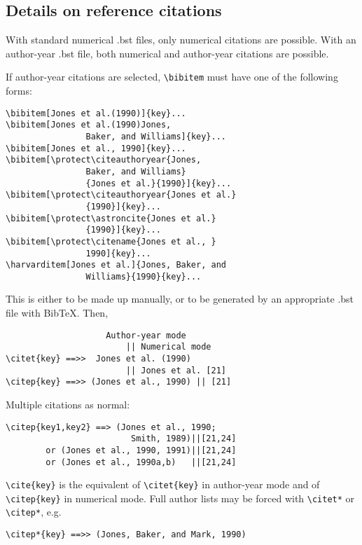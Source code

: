 \documentclass[unnumsec,webpdf,contemporary,large]{oup-authoring-template}%
\theoremstyle{thmstyleone}%
\theoremstyle{thmstyletwo}%
\theoremstyle{thmstylethree}%
\begin{document}
\subsection{Details on reference citations}\label{subsec3}

With standard numerical .bst files, only numerical citations are possible.
With an author-year .bst file, both numerical and author-year citations are possible.

If author-year citations are selected, \verb+\bibitem+ must have one of the following forms:


{\footnotesize%
\begin{verbatim}
\bibitem[Jones et al.(1990)]{key}...
\bibitem[Jones et al.(1990)Jones,
                Baker, and Williams]{key}...
\bibitem[Jones et al., 1990]{key}...
\bibitem[\protect\citeauthoryear{Jones,
                Baker, and Williams}
                {Jones et al.}{1990}]{key}...
\bibitem[\protect\citeauthoryear{Jones et al.}
                {1990}]{key}...
\bibitem[\protect\astroncite{Jones et al.}
                {1990}]{key}...
\bibitem[\protect\citename{Jones et al., }
                1990]{key}...
\harvarditem[Jones et al.]{Jones, Baker, and
                Williams}{1990}{key}...
\end{verbatim}}


This is either to be made up manually, or to be generated by an
appropriate .bst file with BibTeX. Then,


{%
\begin{verbatim}
                    Author-year mode
                        || Numerical mode
\citet{key} ==>>  Jones et al. (1990)
                        || Jones et al. [21]
\citep{key} ==>> (Jones et al., 1990) || [21]
\end{verbatim}}


\noindent
Multiple citations as normal:


{%
\begin{verbatim}
\citep{key1,key2} ==> (Jones et al., 1990;
                         Smith, 1989)||[21,24]
        or (Jones et al., 1990, 1991)||[21,24]
        or (Jones et al., 1990a,b)   ||[21,24]
\end{verbatim}}


\noindent
\verb+\cite{key}+ is the equivalent of \verb+\citet{key}+ in author-year mode
and  of \verb+\citep{key}+ in numerical mode. Full author lists may be forced with
\verb+\citet*+ or \verb+\citep*+, e.g.


{%
\begin{verbatim}
\citep*{key} ==>> (Jones, Baker, and Mark, 1990)
\end{verbatim}}
\end{document}
